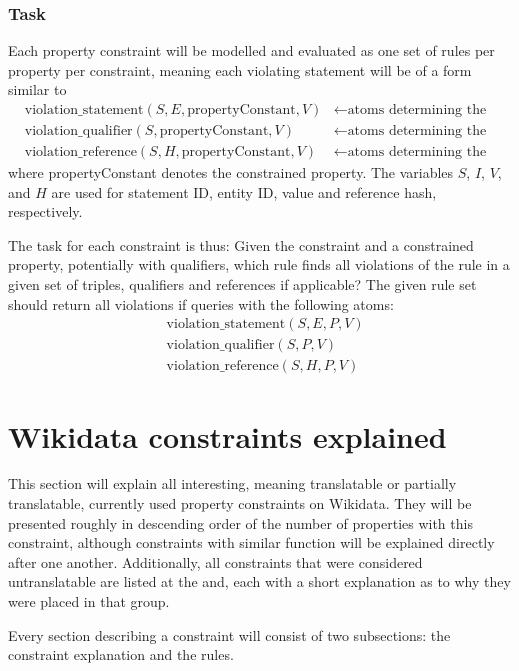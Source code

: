 \documentclass[hyperref,bachelorofscience,fleqn]{cgvpub}
\begin{document}
\subsection{Task}
Each property constraint will be modelled and evaluated as one set of rules per property per constraint, meaning each violating statement will be of a form similar to
\begin{align*}
&\text{violation\_statement}(S, E, \text{propertyConstant}, V) &\leftarrow \text{atoms determining the violation} \\
&\text{violation\_qualifier}(S, \text{propertyConstant}, V) &\leftarrow \text{atoms determining the violation} \\
&\text{violation\_reference}(S, H, \text{propertyConstant}, V) &\leftarrow \text{atoms determining the violation}
\end{align*}
where propertyConstant denotes the constrained property. The variables \(S\), \(I\), \(V\), and \(H\) are used for statement ID, entity ID, value and reference hash, respectively.

The task for each constraint is thus: Given the constraint and a constrained property, potentially with qualifiers, which rule finds all violations of the rule in a given set of triples, qualifiers and references if applicable? The given rule set should return all violations if queries with the following atoms:
\begin{align*}
&\text{violation\_statement}(S, E, P, V) \\
&\text{violation\_qualifier}(S, P, V) \\
&\text{violation\_reference}(S, H, P, V)
\end{align*}

\chapter{Wikidata constraints explained}
This section will explain all interesting, meaning translatable or partially translatable, currently used property constraints on Wikidata. They will be presented roughly in descending order of the number of properties with this constraint, although constraints with similar function will be explained directly after one another. Additionally, all constraints that were considered untranslatable are listed at the and, each with a short explanation as to why they were placed in that group.

Every section describing a constraint will consist of two subsections: the constraint explanation and the rules.
\end{document}
